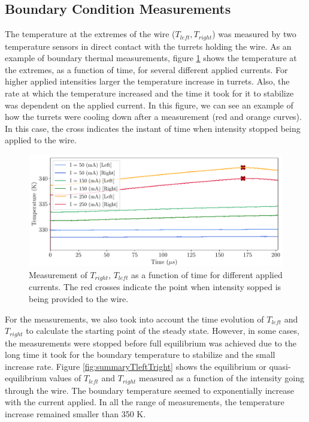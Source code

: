 \subsection{Boundary Condition Measurements}

The temperature at the extremes of the wire ($T_{left}, T_{right}$) was measured by two temperature sensors in direct contact with the turrets holding the wire. As an example of boundary thermal measurements, figure \ref{fig:ExtremeTempMeas} shows the temperature at the extremes, as a function of time, for several different applied currents. For higher applied intensities larger the temperature increase in turrets. Also, the rate at which the temperature increased and the time it took for it to stabilize was dependent on the applied current. In this figure, we can see an example of how the turrets were cooling down after a measurement (red and orange curves). In this case, the cross indicates the instant of time when intensity stopped being applied to the wire. 

\begin{figure}[h]
    \centering
    \includegraphics[width=0.8\columnwidth]{Figure_TrightTleft/TleftTright_time.pdf}
    \caption{Measurement of $T_{right}$, $T_{left}$ as a function of time for different applied currents. The red crosses indicate the point when intensity sopped is being provided to the wire.}
    \label{fig:ExtremeTempMeas}
\end{figure}

For the measurements, we also took into account the time evolution of $T_{left}$ and $T_{right}$ to calculate the starting point of the steady state. However, in some cases, the measurements were stopped before full equilibrium was achieved due to the long time it took for the boundary temperature to stabilize and the small increase rate. Figure \ref{fig:summaryTleftTright} shows the equilibrium or quasi-equilibrium values of $T_{left}$ and $T_{right}$ measured as a function of the intensity going through the wire. The boundary temperature seemed to exponentially increase with the current applied. In all the range of measurements, the temperature increase remained smaller than 350 K.

